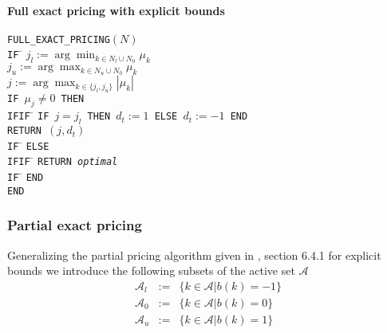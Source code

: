 \documentclass[a4paper]{article}
\begin{document}
\paragraph{Full exact pricing with explicit bounds}
\begin{tabbing}
\texttt{FULL\_EXACT\_PRICING$(N)$} \\
\texttt{IF} \= \kill
\> \texttt{$j_{l}:=\arg\min_{k \in N_{l} \cup
                               N_{0}}\mu_{k}$}  \\
\> \texttt{$j_{u}:=\arg\max_{k \in N_{u} \cup
                               N_{0}}\mu_{k}$}  \\
\> \texttt{$j:=\arg\max_{k \in \{j_{l}, j_{u}\}}\left|\mu_{k}\right|$}  \\
\> \texttt{IF $\mu_{j} \neq 0$ THEN} \\
\texttt{IFIF} \= \kill
\> \texttt{IF $j = j_{l}$ THEN $d_{t}:=1$ ELSE $d_{t}:=-1$ END} \\
\> \texttt{RETURN $(j, d_{t})$} \\
\texttt{IF} \= \kill
\> \texttt{ELSE} \\
\texttt{IFIF} \= \kill
\> \texttt{RETURN \emph{optimal}} \\
\texttt{IF} \= \kill
\> \texttt{END} \\
\texttt{END}
\end{tabbing}


\subsubsection{Partial exact pricing}
Generalizing the partial pricing algorithm given in \cite{Sven}, section 6.4.1 for explicit bounds we introduce the following subsets of the active set $\mathcal{A}$ 
\begin{eqnarray}
\mathcal{A}_{l}&:=&\{k \in \mathcal{A}\left|\right. b\left(k\right)=-1\} \\
\mathcal{A}_{0}&:=&\{k \in \mathcal{A}\left|\right. b\left(k\right)=0\} \\
\mathcal{A}_{u}&:=&\{k \in \mathcal{A}\left|\right. b\left(k\right)=1\}
\end{eqnarray}
\end{document}
